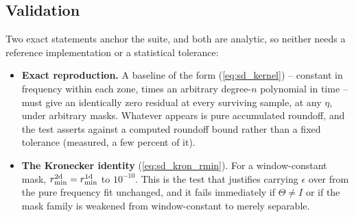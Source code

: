\documentclass{article}
\numberwithin{equation}{section}   %
\begin{document}
\subsection{Validation}
\label{sec:sd_validation}

Two exact statements anchor the suite, and both are analytic, so neither needs a reference implementation or a
statistical tolerance:
\begin{itemize}
\item {\bf Exact reproduction.}  A baseline of the form (\ref{eq:sd_kernel}) -- constant in frequency within
each zone, times an arbitrary degree-$n$ polynomial in time -- must give an identically zero residual at every
surviving sample, at any $\eta$, under arbitrary masks.  Whatever appears is pure accumulated roundoff, and the
test asserts against a computed roundoff bound rather than a fixed tolerance (measured, a few percent of it).
\item {\bf The Kronecker identity} (\ref{eq:sd_kron_rmin}).  For a window-constant mask,
$r_{\rm min}^{\rm 2d} = r_{\rm min}^{\rm 1d}$ to $10^{-10}$.  This is the test that justifies carrying
$\epsilon$ over from the pure frequency fit unchanged, and it fails immediately if $\Theta \ne I$ or if the
mask family is weakened from window-constant to merely separable.
\end{itemize}
\end{document}
